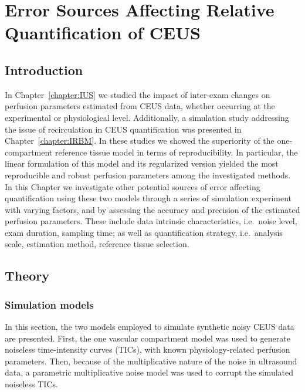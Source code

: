 \chapter{Error Sources Affecting Relative Quantification of CEUS}
\label{chapter:PLOSONE}

\section{Introduction}
In Chapter~\ref{chapter:IUS} we studied the impact of inter-exam changes on perfusion parameters estimated from CEUS data, whether occurring at the experimental or physiological level.
Additionally, a simulation study addressing the issue of recirculation in CEUS quantification was presented in Chapter~\ref{chapter:IRBM}.
In these studies we showed the superiority of the one-compartment reference tissue model in terms of reproducibility.
In particular, the linear formulation of this model and its regularized version yielded the most reproducible and robust perfusion parameters among the investigated methods.
In this Chapter we investigate other potential sources of error affecting quantification using these two models through a series of simulation experiment with varying factors, and by assessing the accuracy and precision of the estimated perfusion parameters.
These include data intrinsic characteristics, i.e.~noise level, exam duration, sampling time; as well as quantification strategy, i.e.~analysis scale, estimation method, reference tissue selection.

\section{Theory}
\subsection{Simulation models}
In this section, the two models employed to simulate synthetic noisy CEUS data are presented.
First, the one vascular compartment model was used to generate noiseless time-intensity curves (TICs), with known physiology-related perfusion parameters.
Then, because of the multiplicative nature of the noise in ultrasound data, a parametric multiplicative noise model was used to corrupt the simulated noiseless TICs. 

